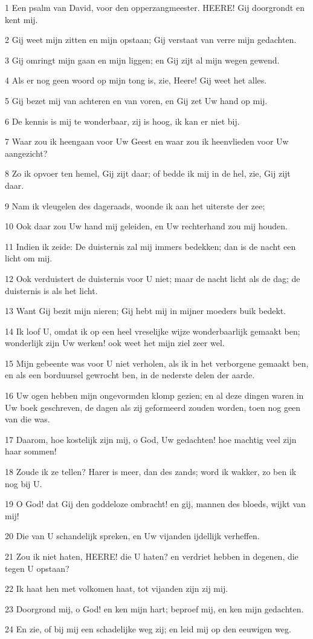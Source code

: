 \par 1 Een psalm van David, voor den opperzangmeester. HEERE! Gij doorgrondt en kent mij.
\par 2 Gij weet mijn zitten en mijn opstaan; Gij verstaat van verre mijn gedachten.
\par 3 Gij omringt mijn gaan en mijn liggen; en Gij zijt al mijn wegen gewend.
\par 4 Als er nog geen woord op mijn tong is, zie, Heere! Gij weet het alles.
\par 5 Gij bezet mij van achteren en van voren, en Gij zet Uw hand op mij.
\par 6 De kennis is mij te wonderbaar, zij is hoog, ik kan er niet bij.
\par 7 Waar zou ik heengaan voor Uw Geest en waar zou ik heenvlieden voor Uw aangezicht?
\par 8 Zo ik opvoer ten hemel, Gij zijt daar; of bedde ik mij in de hel, zie, Gij zijt daar.
\par 9 Nam ik vleugelen des dageraads, woonde ik aan het uiterste der zee;
\par 10 Ook daar zou Uw hand mij geleiden, en Uw rechterhand zou mij houden.
\par 11 Indien ik zeide: De duisternis zal mij immers bedekken; dan is de nacht een licht om mij.
\par 12 Ook verduistert de duisternis voor U niet; maar de nacht licht als de dag; de duisternis is als het licht.
\par 13 Want Gij bezit mijn nieren; Gij hebt mij in mijner moeders buik bedekt.
\par 14 Ik loof U, omdat ik op een heel vreselijke wijze wonderbaarlijk gemaakt ben; wonderlijk zijn Uw werken! ook weet het mijn ziel zeer wel.
\par 15 Mijn gebeente was voor U niet verholen, als ik in het verborgene gemaakt ben, en als een borduursel gewrocht ben, in de nederste delen der aarde.
\par 16 Uw ogen hebben mijn ongevormden klomp gezien; en al deze dingen waren in Uw boek geschreven, de dagen als zij geformeerd zouden worden, toen nog geen van die was.
\par 17 Daarom, hoe kostelijk zijn mij, o God, Uw gedachten! hoe machtig veel zijn haar sommen!
\par 18 Zoude ik ze tellen? Harer is meer, dan des zands; word ik wakker, zo ben ik nog bij U.
\par 19 O God! dat Gij den goddeloze ombracht! en gij, mannen des bloeds, wijkt van mij!
\par 20 Die van U schandelijk spreken, en Uw vijanden ijdellijk verheffen.
\par 21 Zou ik niet haten, HEERE! die U haten? en verdriet hebben in degenen, die tegen U opstaan?
\par 22 Ik haat hen met volkomen haat, tot vijanden zijn zij mij.
\par 23 Doorgrond mij, o God! en ken mijn hart; beproef mij, en ken mijn gedachten.
\par 24 En zie, of bij mij een schadelijke weg zij; en leid mij op den eeuwigen weg.

